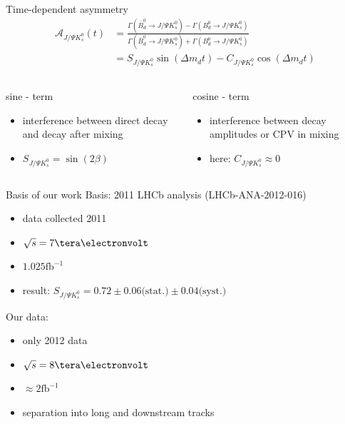 \documentclass{beamer}
\newcommand{\SJPsi}{S_{J/\Psi K_s^0}}
\begin{document}
	\begin{frame}{Time-dependent asymmetry}
	\begin{align}
	\mathcal{A}_{J/\Psi K_s^0}(t) &= \frac{\Gamma(\bar{B}_d^0 \rightarrow J/\Psi K_s^0)-\Gamma(B_d^0 \rightarrow J/\Psi K_s^0)}{\Gamma(\bar{B}_d^0 \rightarrow J/\Psi K_s^0)+\Gamma(B_d^0 \rightarrow J/\Psi K_s^0)} \\
		&= S_{J/\Psi K_s^0}\sin(\Delta m_d t) - C_{J/\Psi K_s^0}\cos(\Delta m_d t)
	\end{align}
	\begin{columns}
	\begin{block}{sine - term}
	\begin{itemize}
		\item interference between direct decay and decay after mixing
		\item $S_{J/\Psi K_s^0} = \sin(2\beta)$
	\end{itemize}
	\end{block}
	
	\begin{block}{cosine - term}
	\begin{itemize}
		\item interference between decay amplitudes or CPV in mixing
		\item here: $C_{J/\Psi K_s^0} \approx 0$
	\end{itemize}
	\end{block}
	\end{columns}
	\end{frame}
	
	\begin{frame}{Basis of our work}
	Basis: 2011 LHCb analysis (LHCb-ANA-2012-016)
	\begin{itemize}
	    \item data collected 2011
	    \item $\sqrt{s} = 7\tera\electronvolt$
	    \item $1.025 \mathrm{fb}^{-1}$
	    \item result: $\SJPsi = 0.72 \pm 0.06 \text{(stat.)} \pm 0.04 \text{(syst.)}$
	\end{itemize}
	
	Our data:
	\begin{itemize}
	    \item only 2012 data
	    \item $\sqrt{s} = 8\tera\electronvolt$
	    \item $\approx 2 \mathrm{fb}^{-1}$
   	    \item separation into long and downstream tracks
	\end{itemize}
	\end{frame}
	
\end{document}
